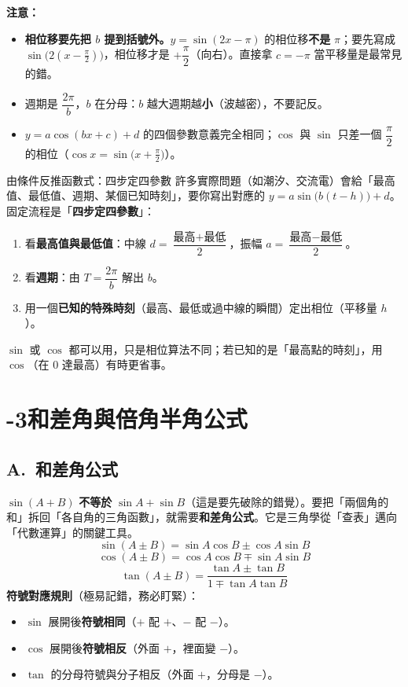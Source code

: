 \documentclass[11pt]{article}
\begin{document}
\textbf{注意：}
\begin{itemize}\setlength{\itemsep}{1pt}
\item \textbf{相位移要先把 $b$ 提到括號外。}$y=\sin(2x-\pi)$ 的相位移\textbf{不是} $\pi$；要先寫成 $\sin\!\big(2(x-\tfrac{\pi}{2})\big)$，相位移才是 $+\dfrac{\pi}{2}$（向右）。直接拿 $c=-\pi$ 當平移量是最常見的錯。
\item 週期是 $\dfrac{2\pi}{b}$，$b$ 在分母：$b$ 越大週期越\textbf{小}（波越密），不要記反。
\item $y=a\cos(bx+c)+d$ 的四個參數意義完全相同；$\cos$ 與 $\sin$ 只差一個 $\dfrac{\pi}{2}$ 的相位（$\cos x=\sin\!\big(x+\tfrac{\pi}{2}\big)$）。
\end{itemize}

\begin{補充框}{由條件反推函數式：四步定四參數}
許多實際問題（如潮汐、交流電）會給「最高值、最低值、週期、某個已知時刻」，要你寫出對應的 $y=a\sin\!\big(b(t-h)\big)+d$。固定流程是「\textbf{四步定四參數}」：
\begin{enumerate}\setlength{\itemsep}{1pt}
\item 看\textbf{最高值與最低值}：中線 $d=\dfrac{\text{最高}+\text{最低}}{2}$，振幅 $a=\dfrac{\text{最高}-\text{最低}}{2}$。
\item 看\textbf{週期}：由 $T=\dfrac{2\pi}{b}$ 解出 $b$。
\item 用一個\textbf{已知的特殊時刻}（最高、最低或過中線的瞬間）定出相位（平移量 $h$）。
\end{enumerate}
$\sin$ 或 $\cos$ 都可以用，只是相位算法不同；若已知的是「最高點的時刻」，用 $\cos$（在 $0$ 達最高）有時更省事。
\end{補充框}

\section*{-3\quad 和差角與倍角半角公式}

\subsection*{\sffamily A.\ 和差角公式}

$\sin(A+B)$ \textbf{不等於} $\sin A+\sin B$（這是要先破除的錯覺）。要把「兩個角的和」拆回「各自角的三角函數」，就需要\textbf{和差角公式}。它是三角學從「查表」邁向「代數運算」的關鍵工具。
$$\boxed{\;\sin(A\pm B)=\sin A\cos B\pm\cos A\sin B\;}$$
$$\boxed{\;\cos(A\pm B)=\cos A\cos B\mp\sin A\sin B\;}$$
$$\boxed{\;\tan(A\pm B)=\frac{\tan A\pm\tan B}{1\mp\tan A\tan B}\;}$$
\textbf{符號對應規則}（極易記錯，務必盯緊）：
\begin{itemize}\setlength{\itemsep}{1pt}
\item $\sin$ 展開後\textbf{符號相同}（$+$ 配 $+$、$-$ 配 $-$）。
\item $\cos$ 展開後\textbf{符號相反}（外面 $+$，裡面變 $-$）。
\item $\tan$ 的分母符號與分子相反（外面 $+$，分母是 $-$）。
\end{itemize}
\end{document}
